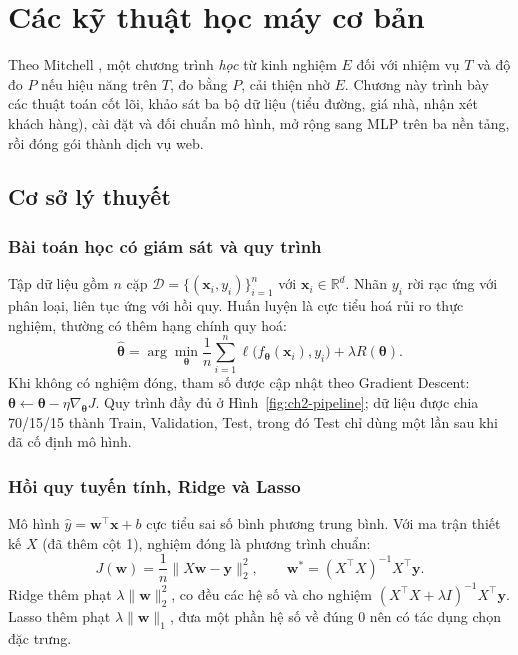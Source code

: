 \chapter{Các kỹ thuật học máy cơ bản}\label{chap:ml}

Theo Mitchell \cite{ch2:mitchell1997}, một chương trình \emph{học} từ kinh nghiệm $E$ đối với nhiệm vụ $T$ và độ đo $P$ nếu hiệu năng
trên $T$, đo bằng $P$, cải thiện nhờ $E$. Chương này trình bày các thuật toán cốt lõi, khảo sát ba bộ dữ liệu (tiểu đường, giá nhà, nhận
xét khách hàng), cài đặt và đối chuẩn mô hình, mở rộng sang MLP trên ba nền tảng, rồi đóng gói thành dịch vụ web.

\section{Cơ sở lý thuyết}\label{sec:ml-theory}
\subsection{Bài toán học có giám sát và quy trình}
Tập dữ liệu gồm $n$ cặp $\mathcal{D}=\{(\mathbf{x}_i,y_i)\}_{i=1}^n$ với $\mathbf{x}_i\in\mathbb{R}^d$. Nhãn $y_i$ rời rạc ứng với phân
loại, liên tục ứng với hồi quy. Huấn luyện là cực tiểu hoá rủi ro thực nghiệm, thường có thêm hạng chính quy hoá:
\begin{equation}
  \hat{\boldsymbol\theta}=\arg\min_{\boldsymbol\theta}\frac1n\sum_{i=1}^n\ell\big(f_{\boldsymbol\theta}(\mathbf{x}_i),y_i\big)+\lambda R(\boldsymbol\theta).
\end{equation}
Khi không có nghiệm đóng, tham số được cập nhật theo Gradient Descent:
$\boldsymbol\theta\leftarrow\boldsymbol\theta-\eta\nabla_{\boldsymbol\theta}J$. Quy trình đầy đủ ở Hình~\ref{fig:ch2-pipeline}; dữ liệu được chia
70/15/15 thành Train, Validation, Test, trong đó Test chỉ dùng một lần sau khi đã cố định mô hình.


\subsection{Hồi quy tuyến tính, Ridge và Lasso}
Mô hình $\hat y=\mathbf{w}^\top\mathbf{x}+b$ cực tiểu sai số bình phương trung bình. Với ma trận thiết kế $X$ (đã thêm cột 1), nghiệm đóng là
phương trình chuẩn:
\begin{equation}
  J(\mathbf{w})=\frac1n\|X\mathbf{w}-\mathbf{y}\|_2^2,\qquad \mathbf{w}^*=(X^\top X)^{-1}X^\top\mathbf{y}.
\end{equation}
Ridge \cite{ch2:hoerl1970} thêm phạt $\lambda\|\mathbf{w}\|_2^2$, co đều các hệ số và cho nghiệm $(X^\top X+\lambda I)^{-1}X^\top\mathbf{y}$. Lasso
\cite{ch2:tibshirani1996} thêm phạt $\lambda\|\mathbf{w}\|_1$, đưa một phần hệ số về đúng 0 nên có tác dụng chọn đặc trưng.

